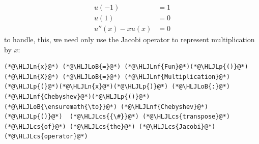 \documentclass[12pt,a4paper]{article}
\newcommand{\HLJLn}[1]{#1}
\newcommand{\HLJLnf}[1]{\textcolor[RGB]{66,102,213}{#1}}
\newcommand{\HLJLoB}[1]{\textcolor[RGB]{102,102,102}{\textbf{#1}}}
\newcommand{\HLJLp}[1]{#1}
\newcommand{\HLJLcs}[1]{\textcolor[RGB]{153,153,119}{\textit{#1}}}
\begin{document}
\begin{align*}
u(-1) &= 1\\
u(1) &= 0\\
u''(x) - xu(x) &= 0
\end{align*}
to handle, this, we need only use the Jacobi operator to represent multiplication by $x$:


\begin{lstlisting}
(*@\HLJLn{x}@*) (*@\HLJLoB{=}@*) (*@\HLJLnf{Fun}@*)(*@\HLJLp{()}@*)
(*@\HLJLn{X}@*) (*@\HLJLoB{=}@*) (*@\HLJLnf{Multiplication}@*)(*@\HLJLp{(}@*)(*@\HLJLn{x}@*)(*@\HLJLp{)}@*) (*@\HLJLoB{:}@*) (*@\HLJLnf{Chebyshev}@*)(*@\HLJLp{()}@*) (*@\HLJLoB{\ensuremath{\to}}@*) (*@\HLJLnf{Chebyshev}@*)(*@\HLJLp{()}@*)  (*@\HLJLcs{{\#}}@*) (*@\HLJLcs{transpose}@*) (*@\HLJLcs{of}@*) (*@\HLJLcs{the}@*) (*@\HLJLcs{Jacobi}@*) (*@\HLJLcs{operator}@*)
\end{lstlisting}
\end{document}
